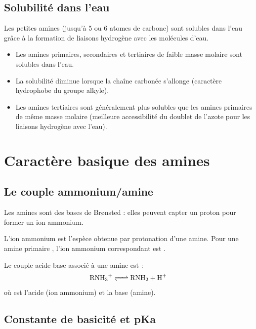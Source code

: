 \subsection{Solubilité dans l'eau}

Les petites amines (jusqu'à 5 ou 6 atomes de carbone) sont solubles dans l'eau grâce à la formation de liaisons hydrogène avec les molécules d'eau.

\begin{propriete}
\begin{itemize}
    \item Les amines primaires, secondaires et tertiaires de faible masse molaire sont solubles dans l'eau.
    \item La solubilité diminue lorsque la chaîne carbonée s'allonge (caractère hydrophobe du groupe alkyle).
    \item Les amines tertiaires sont généralement plus solubles que les amines primaires de même masse molaire (meilleure accessibilité du doublet de l'azote pour les liaisons hydrogène avec l'eau).
\end{itemize}
\end{propriete}

\section{Caractère basique des amines}

\subsection{Le couple ammonium/amine}

Les amines sont des bases de Brønsted : elles peuvent capter un proton  pour former un ion ammonium.

\begin{definition}
L'ion ammonium est l'espèce obtenue par protonation d'une amine. Pour une amine primaire , l'ion ammonium correspondant est .
\end{definition}

\begin{loi}
Le couple acide-base associé à une amine est :
\[\ce{RNH3+ <=> RNH2 + H+}\]
où  est l'acide (ion ammonium) et  la base (amine).
\end{loi}

\subsection{Constante de basicité et pKa}

